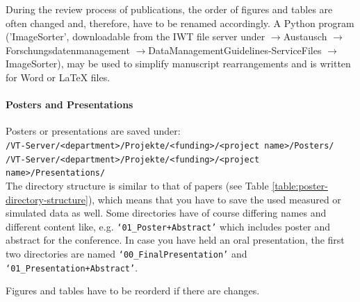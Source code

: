 During the review process of publications, the order of figures and tables are often changed and, therefore, have to be renamed accordingly. A Python program ('ImageSorter', downloadable from the IWT file server under $\rightarrow$Austausch $\rightarrow$Forschungsdatenmanagement $\rightarrow$Data\-ManagementGuidelines-ServiceFiles  $\rightarrow$ImageSorter), may be used to simplify manuscript rearrangements and is written for Word or LaTeX files.




\paragraph{Posters and Presentations}



\begin{table}[!h]
  \caption{%
  The data of every poster has to be saved in seven subdirectories;
  further remarks: \\
  **When the poster was presented, the corresponding presenter loads the last
  and revised version (i.e. only the real used but absolutely complete data)
  into the protected directory \\
  ***If the data reproduced in a figure/table is from distributed raw data
  directories, it is sufficient to save here only the generating program%
  }
 
  

 \label{table:poster-directory-structure}

\end{table}

\noindent Posters or presentations are saved under: \\
\texttt{/VT-Server/<department>/Projekte/<funding>/<project name>/Posters/} \\
\texttt{/VT-Server/<department>/Projekte/<funding>/<project name>/Presentations/} \\
The directory structure is similar to that of papers (see Table \ref{table:poster-directory-structure}), which means that you have
to save the used measured or simulated data as well. Some directories have of
course differing names and different content like, e.g.
\texttt{‘01\_Poster+Abstract’} which includes poster and abstract for the
conference. In case you have held an oral presentation, the first two
directories are named \texttt{‘00\_FinalPresentation’} and
\texttt{‘01\_Presentation+Abstract’}.

Figures and tables have to be reorderd if there are changes.


